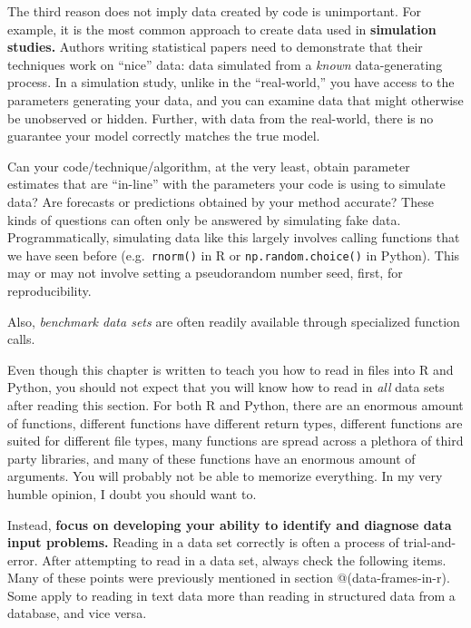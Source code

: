 \documentclass[
  12pt,
  krantz2]{krantz}
\begin{document}
\begin{rmd-details}
The third reason does not imply data created by code is unimportant. For example, it is the most common approach to create data used in \textbf{simulation studies.} Authors writing statistical papers need to demonstrate that their techniques work on ``nice'' data: data simulated from a \emph{known} data-generating process. In a simulation study, unlike in the ``real-world,'' you have access to the parameters generating your data, and you can examine data that might otherwise be unobserved or hidden. Further, with data from the real-world, there is no guarantee your model correctly matches the true model.

Can your code/technique/algorithm, at the very least, obtain parameter estimates that are ``in-line'' with the parameters your code is using to simulate data? Are forecasts or predictions obtained by your method accurate? These kinds of questions can often only be answered by simulating fake data. Programmatically, simulating data like this largely involves calling functions that we have seen before (e.g.~\texttt{rnorm()} in R or \texttt{np.random.choice()} in Python). This may or may not involve setting a pseudorandom number seed, first, for reproducibility.

Also, \emph{benchmark data sets} are often readily available through specialized function calls.

\end{rmd-details}

Even though this chapter is written to teach you how to read in files into R and Python, you should not expect that you will know how to read in \emph{all} data sets after reading this section. For both R and Python, there are an enormous amount of functions, different functions have different return types, different functions are suited for different file types, many functions are spread across a plethora of third party libraries, and many of these functions have an enormous amount of arguments. You will probably not be able to memorize everything. In my very humble opinion, I doubt you should want to.

Instead, \textbf{focus on developing your ability to identify and diagnose data input problems.} Reading in a data set correctly is often a process of trial-and-error. After attempting to read in a data set, always check the following items. Many of these points were previously mentioned in section @(data-frames-in-r). Some apply to reading in text data more than reading in structured data from a database, and vice versa.
\end{document}
